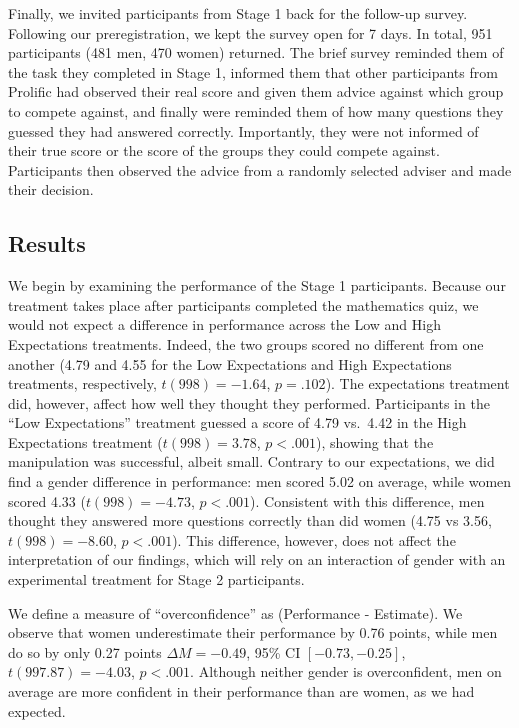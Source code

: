 \documentclass[
  man,
  floatsintext,
  longtable,
  nolmodern,
  notxfonts,
  notimes,
  colorlinks=true,linkcolor=blue,citecolor=blue,urlcolor=blue]{apa7}
\begin{document}
Finally, we invited participants from Stage 1 back for the follow-up
survey. Following our preregistration, we kept the survey open for 7
days. In total, 951 participants (481 men, 470 women) returned. The
brief survey reminded them of the task they completed in Stage 1,
informed them that other participants from Prolific had observed their
real score and given them advice against which group to compete against,
and finally were reminded them of how many questions they guessed they
had answered correctly. Importantly, they were not informed of their
true score or the score of the groups they could compete against.
Participants then observed the advice from a randomly selected adviser
and made their decision.

\subsection{Results}\label{results-2}

We begin by examining the performance of the Stage 1 participants.
Because our treatment takes place after participants completed the
mathematics quiz, we would not expect a difference in performance across
the Low and High Expectations treatments. Indeed, the two groups scored
no different from one another (4.79 and 4.55 for the Low Expectations
and High Expectations treatments, respectively, \(t(998) = -1.64\),
\(p = .102\)). The expectations treatment did, however, affect how well
they thought they performed. Participants in the ``Low Expectations''
treatment guessed a score of 4.79 vs.~4.42 in the High Expectations
treatment (\(t(998) = 3.78\), \(p < .001\)), showing that the
manipulation was successful, albeit small. Contrary to our expectations,
we did find a gender difference in performance: men scored 5.02 on
average, while women scored 4.33 (\(t(998) = -4.73\), \(p < .001\)).
Consistent with this difference, men thought they answered more
questions correctly than did women (4.75 vs 3.56, \(t(998) = -8.60\),
\(p < .001\)). This difference, however, does not affect the
interpretation of our findings, which will rely on an interaction of
gender with an experimental treatment for Stage 2 participants.

We define a measure of ``overconfidence'' as (Performance - Estimate).
We observe that women underestimate their performance by 0.76 points,
while men do so by only 0.27 points \(\Delta M = -0.49\), 95\% CI
\([-0.73, -0.25]\), \(t(997.87) = -4.03\), \(p < .001\). Although
neither gender is overconfident, men on average are more confident in
their performance than are women, as we had expected.
\end{document}
